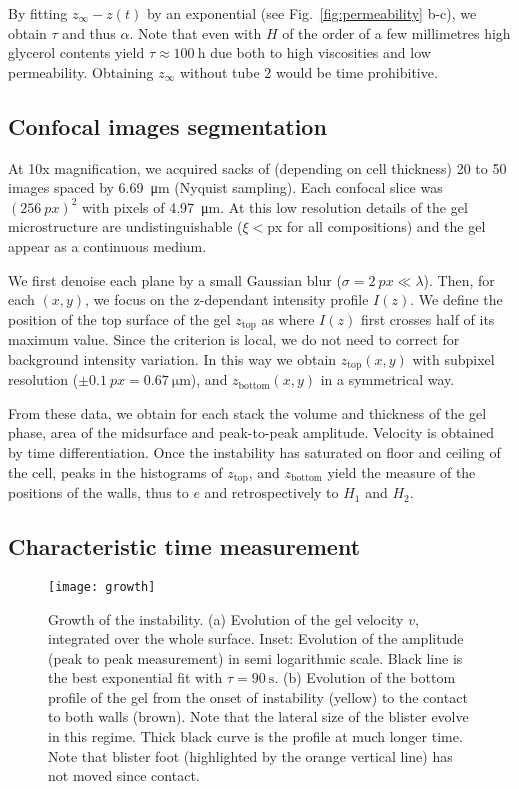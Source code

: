 \documentclass[twocolumn,superscriptaddress,showpacs,preprintnumbers,
amsmath,amssymb,prl]{revtex4-1}
\begin{document}
By fitting $z_\infty-z(t)$ by an exponential (see Fig.~\ref{fig:permeability} b-c), we obtain $\tau$ and thus $\alpha$. Note that even with $H$ of the order of a few millimetres high glycerol contents yield $\tau\approx \SI{100}{\hour}$ due both to high viscosities and low permeability. Obtaining $z_\infty$ without tube 2 would be time prohibitive.

\subsection*{Confocal images segmentation}

At 10x magnification, we acquired sacks of (depending on cell thickness) 20 to 50 images spaced by \SI{6.69}{\micro\metre} (Nyquist sampling). Each confocal slice was $(\SI{256}{px})^2$ with pixels of \SI{4.97}{\micro\metre}. At this low resolution details of the gel microstructure are undistinguishable ($\xi<$px for all compositions) and the gel appear as a continuous medium.

We first denoise each plane by a small Gaussian blur ($\sigma=\SI{2}{px}\ll\lambda$). Then, for each $(x,y)$, we focus on the z-dependant intensity profile $I(z)$. We define the position of the top surface of the gel $z_\text{top}$ as where $I(z)$ first crosses half of its maximum value. Since the criterion is local, we do not need to correct for background intensity variation. In this way we obtain $z_\text{top}(x,y)$ with subpixel resolution ($\pm\SI{0.1}{px}=\SI{0.67}{\micro\metre}$), and $z_\text{bottom}(x,y)$ in a symmetrical way.

From these data, we obtain for each stack the volume and thickness of the gel phase, area of the midsurface and peak-to-peak amplitude. Velocity is obtained by time differentiation. Once the instability has saturated on floor and ceiling of the cell, peaks in the histograms of $z_\text{top}$, and $z_\text{bottom}$ yield the measure of the positions of the walls, thus to $e$ and retrospectively to $H_1$ and $H_2$.

\subsection*{Characteristic time measurement}
\begin{figure}
	\texttt{[image: growth]}
	\caption{Growth of the instability. (a) Evolution of the gel velocity $v$, integrated over the whole surface. Inset: Evolution of the amplitude (peak to peak measurement) in semi logarithmic scale. Black line is the best exponential fit with $\tau=\SI{90}{\second}$. (b) Evolution of the bottom profile of the gel from the onset of instability (yellow) to the contact to both walls (brown). Note that the lateral size of the blister evolve in this regime. Thick black curve is the profile at much longer time. Note that blister foot (highlighted by the orange vertical line) has not moved since contact.}
	\label{fig:growth}
\end{figure}
\end{document}
